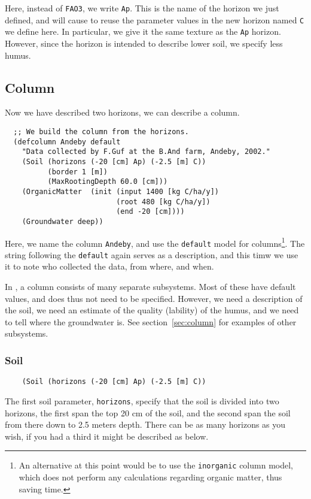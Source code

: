 \documentclass[a4paper,11pt]{article}
\begin{document}
Here, instead of \texttt{FAO3}, we write \texttt{Ap}.  This is the
name of the horizon we just defined, and will cause \daisy{} to reuse
the parameter values in the new horizon named \texttt{C} we define
here.  In particular, we give it the same texture as the \texttt{Ap}
horizon.  However, since the horizon is intended to describe lower
soil, we specify less humus.

\subsection{Column}
\label{ex:column}

Now we have described two horizons, we can describe a column.

\begin{verbatim}
  ;; We build the column from the horizons.
  (defcolumn Andeby default
    "Data collected by F.Guf at the B.And farm, Andeby, 2002."
    (Soil (horizons (-20 [cm] Ap) (-2.5 [m] C))
          (border 1 [m])
          (MaxRootingDepth 60.0 [cm]))
    (OrganicMatter  (init (input 1400 [kg C/ha/y])
                          (root 480 [kg C/ha/y])
                          (end -20 [cm])))
    (Groundwater deep))
\end{verbatim}

Here, we name the column \texttt{Andeby}, and use the \texttt{default}
model for \daisy{} columns\footnote{An alternative at this point would
  be to use the \texttt{inorganic} column model, which does not
  perform any calculations regarding organic matter, thus saving
  time.}.  The string following the \texttt{default} again serves as a
description, and this timw we use it to note who collected the data,
from where, and when.

In \daisy{}, a column consists of many separate subsystems.  Most of
these have default values, and does thus not need to be specified.
However, we need a description of the soil, we need an estimate of the
quality (lability) of the humus, and we need to tell \daisy{} where
the groundwater is.  See section~\ref{sec:column} for examples of
other subsystems.

\subsubsection{Soil}
\label{ex:soil}

\begin{verbatim}
    (Soil (horizons (-20 [cm] Ap) (-2.5 [m] C))
\end{verbatim}
The first soil parameter, \texttt{horizons}, specify that the soil is
divided into two horizons, the first span the top 20 cm of the soil,
and the second span the soil from there down to 2.5 meters depth.
There can be as many horizons as you wish, if you had a third it might
be described as below.
\end{document}

